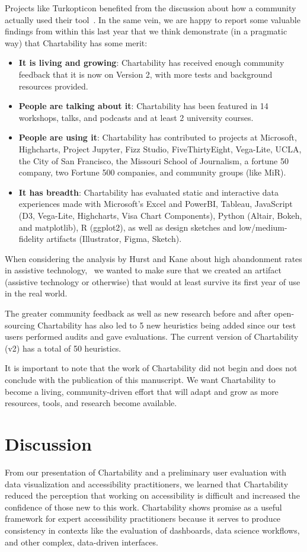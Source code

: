 \documentclass{egpubl}
\begin{document}
Projects like Turkopticon benefited from the discussion about how a community actually used their tool~\cite{irani_turkopticon_13}. In the same vein, we are happy to report some valuable findings from within this last year that we think demonstrate (in a pragmatic way) that Chartability has some merit: 
\begin{itemize}
    \item \textbf{It is living and growing}: Chartability has received enough community feedback that it is now on Version 2, with more tests and background resources provided.
    \item \textbf{People are talking about it}: Chartability has been featured in 14 workshops, talks, and podcasts and at least 2 university courses.
    \item \textbf{People are using it}: Chartability has contributed to projects at Microsoft, Highcharts, Project Jupyter, Fizz Studio, FiveThirtyEight, Vega-Lite, UCLA, the City of San Francisco, the Missouri School of Journalism, a fortune 50 company, two Fortune 500 companies, and community groups (like MiR).
    \item \textbf{It has breadth}: Chartability has evaluated static and interactive data experiences made with Microsoft's Excel and PowerBI, Tableau, JavaScript (D3, Vega-Lite, Highcharts, Visa Chart Components), Python (Altair, Bokeh, and matplotlib), R (ggplot2), as well as design sketches and low/medium-fidelity artifacts (Illustrator, Figma, Sketch).
\end{itemize}

When considering the analysis by Hurst and Kane about high abandonment rates in assistive technology,~\cite{hurst_making_2013} we wanted to make sure that we created an artifact (assistive technology or otherwise) that would at least survive its first year of use in the real world. 

The greater community feedback as well as new research before and after open-sourcing Chartability has also led to 5 new heuristics being added since our test users performed audits and gave evaluations. The current version of Chartability (v2) has a total of 50 heuristics. 

It is important to note that the work of Chartability did not begin and does not conclude with the publication of this manuscript. We want Chartability to become a living, community-driven effort that will adapt and grow as more resources, tools, and research become available.

\section{Discussion}
From our presentation of Chartability and a preliminary user evaluation with data visualization and accessibility practitioners, we learned that Chartability reduced the perception that working on accessibility is difficult and increased the confidence of those new to this work. Chartability shows promise as a useful framework for expert accessibility practitioners because it serves to produce consistency in contexts like the evaluation of dashboards, data science workflows, and other complex, data-driven interfaces. 
\end{document}
